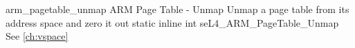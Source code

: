 %
%
%
%

\apidoc
{arm_pagetable_unmap}
{ARM Page Table - Unmap}
{Unmap a page table from its address space and zero it out}
{static inline int seL4\_ARM\_PageTable\_Unmap}
{
}
{\errorenumdesc}
{See \autoref{ch:vspace}}
